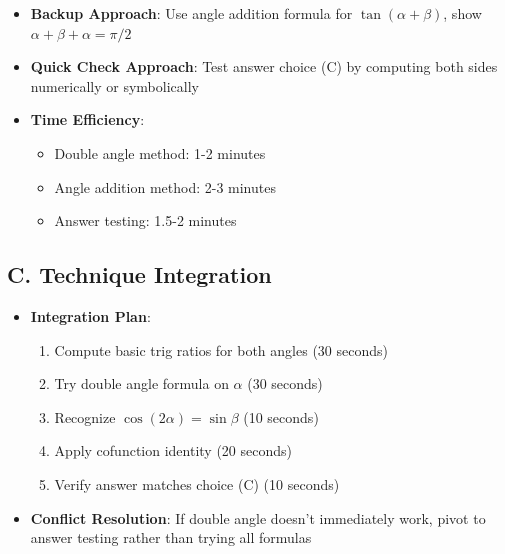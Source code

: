 \documentclass[11pt]{article}
\begin{document}
\begin{techniquesbox}
\begin{itemize}[leftmargin=*]
    \item \textbf{Backup Approach}: Use angle addition formula for $\tan(\alpha + \beta)$, show $\alpha + \beta + \alpha = \pi/2$
    
    \item \textbf{Quick Check Approach}: Test answer choice (C) by computing both sides numerically or symbolically
    
    \item \textbf{Time Efficiency}: 
    \begin{itemize}
        \item Double angle method: 1-2 minutes
        \item Angle addition method: 2-3 minutes
        \item Answer testing: 1.5-2 minutes
    \end{itemize}
\end{itemize}

\subsection*{C. Technique Integration}
\begin{itemize}[leftmargin=*]
    \item \textbf{Integration Plan}:
    \begin{enumerate}
        \item Compute basic trig ratios for both angles (30 seconds)
        \item Try double angle formula on $\alpha$ (30 seconds)
        \item Recognize $\cos(2\alpha) = \sin\beta$ (10 seconds)
        \item Apply cofunction identity (20 seconds)
        \item Verify answer matches choice (C) (10 seconds)
    \end{enumerate}
    
    \item \textbf{Conflict Resolution}: If double angle doesn't immediately work, pivot to answer testing rather than trying all formulas
\end{itemize}
\end{techniquesbox}
\end{document}
